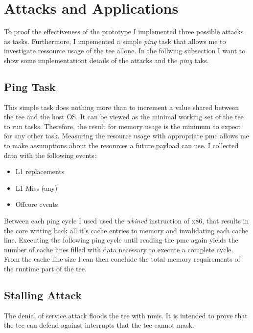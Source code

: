 \section{Attacks and Applications}
\label{sec:implementation:attacks}

To proof the effectiveness of the prototype I implemented three possible attacks
as tasks. Furthermore, I impemented a simple \textit{ping} task that allows me
to investigate ressource usage of the \gls{tee} allone. In the follwing
subsection I want to show some implementationt details of the attacks and the
\textit{ping} taks.

\subsection{Ping Task}
\label{sec:implementation:attacks:ping}
This simple task does nothing more than to increment a value shared between the
\gls{tee} and the host OS. It can be viewed as the minimal working set of the
\gls{tee} to run tasks. Therefore, the result for memory usage is the minimum to
expect for any other task. Measuring the resource usage with appropriate
\gls{pmc} allows me to make assumptions about the resources a future payload can
use. I collected data with the following events:
\begin{itemize}
    \item L1 replacements
    \item L1 Miss (any)
    \item Offcore events 
\end{itemize}
Between each ping cycle I used used the \textit{wbinvd} instruction of x86, that
results in the core writing back all it's cache entries to memory and
invalidating each cache line. Executing the following ping cycle until reading
the \gls{pmc} again yields the number of cache lines filled with data necessary
to execute a complete cycle. From the cache line size I can then conclude the
total memory requirements of the runtime part of the \gls{tee}.

\subsection{Stalling Attack}
The denial of service attack floods the \gls{tee} with \glspl{nmi}. It is
intended to prove that the \gls{tee} can defend against interrupts that the
\gls{tee} cannot mask.


